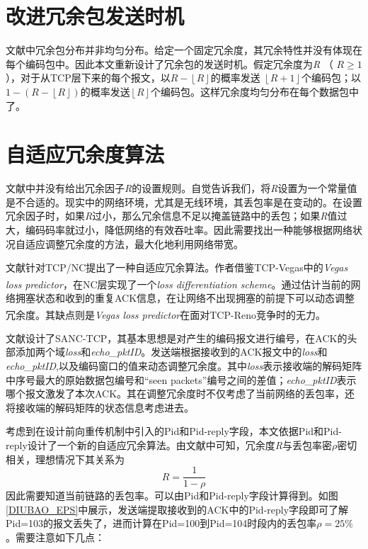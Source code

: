 \section{改进冗余包发送时机}
文献\cite{Sundararajan2009}中冗余包分布并非均匀分布。给定一个固定冗余度，其冗余特性并没有体现在每个编码包中。因此本文重新设计了冗余包的发送时机。假定冗余度为\emph{R} （ $R \ge 1$ ），对于从TCP层下来的每个报文，以$R - \left\lfloor R \right\rfloor$的概率发送 $\left\lfloor R+1 \right\rfloor$个编码包；以$1-\left(R-\left\lfloor R \right\rfloor\right)$的概率发送$\left\lfloor R \right\rfloor$个编码包。这样冗余度均匀分布在每个数据包中了。
\section{自适应冗余度算法}
文献\cite{Sundararajan2009}中并没有给出冗余因子\emph{R}的设置规则。自觉告诉我们，将\emph{R}设置为一个常量值是不合适的。现实中的网络环境，尤其是无线环境，其丢包率是在变动的。在设置冗余因子时，如果\emph{R}过小，那么冗余信息不足以掩盖链路中的丢包；如果\emph{R}值过大，编码码率就过小，降低网络的有效吞吐率。因此需要找出一种能够根据网络状况自适应调整冗余度的方法，最大化地利用网络带宽。
\par
文献\cite{6261883}针对TCP/NC提出了一种自适应冗余算法。作者借鉴TCP-Vegas中的\emph{Vegas loss predictor}\textsuperscript{\cite{martignon2004loss,brakmo1995tcp}}，在NC层实现了一个\emph{loss differentiation scheme}。通过估计当前的网络拥塞状态和收到的重复ACK信息，在让网络不出现拥塞的前提下可以动态调整冗余度。其缺点则是\emph{Vegas loss predictor}在面对TCP-Reno竞争时的无力\textsuperscript{\cite{hasegawa2000fairness}}。
\par
文献\cite{song2011self}设计了SANC-TCP，其基本思想是对产生的编码报文进行编号，在ACK的头部添加两个域\emph{loss}和\emph{echo\_pktID}。发送端根据接收到的ACK报文中的\emph{loss}和\emph{echo\_pktID},以及编码窗口的值来动态调整冗余度。其中\emph{loss}表示接收端的解码矩阵中序号最大的原始数据包编号和“seen packets”编号之间的差值；\emph{echo\_pktID}表示哪个报文激发了本次ACK。其在调整冗余度时不仅考虑了当前网络的丢包率，还将接收端的解码矩阵的状态信息考虑进去。
\par
考虑到在设计前向重传机制中引入的Pid和Pid-reply字段，本文依据Pid和Pid-reply设计了一个新的自适应冗余算法。由文献\cite{Sundararajan2011}中可知，冗余度\emph{R}与丢包率密$\rho$密切相关，理想情况下其关系为
\begin{equation}
	R=\dfrac{1}{1-\rho}
\end{equation}
因此需要知道当前链路的丢包率。可以由Pid和Pid-reply字段计算得到。如图\ref{DIUBAO_EPS}中展示，发送端提取接收到的ACK中的Pid-reply字段即可了解Pid=103的报文丢失了，进而计算在Pid=100到Pid=104时段内的丢包率$\rho=25\%$。需要注意如下几点：
